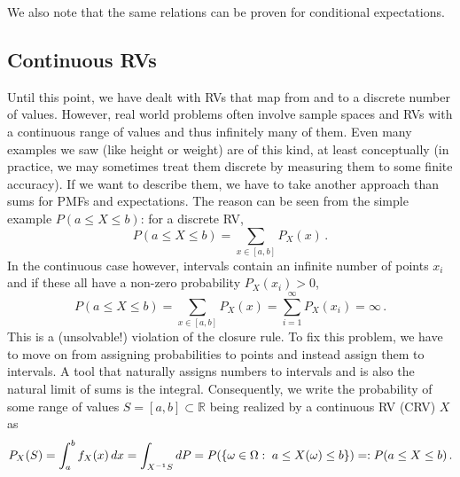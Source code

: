 We also note that the same relations can be proven for conditional expectations.



	\subsection{Continuous RVs}\label{subsec:crvs}
Until this point, we have dealt with RVs that map from and to a discrete number of values. However, real world problems often involve sample spaces and RVs with a continuous range of values and thus infinitely many of them. Even many examples we saw (like height or weight) are of this kind, at least conceptually (in practice, we may sometimes treat them discrete by measuring them to some finite accuracy). If we want to describe them, we have to take another approach than sums for PMFs and expectations. The reason can be seen from the simple example $P(a \leq X \leq b)$: for a discrete RV,
\begin{equation}
P(a \leq X \leq b) = \sum_{x \in [a, b]} P_X(x) \, .
\end{equation}
In the continuous case however, intervals contain an infinite number of points $x_i$ and if these all have a non-zero probability $P_X(x_i) > 0$,
\begin{equation}
P(a \leq X \leq b) = \sum_{x \in [a, b]} P_X(x) = \sum_{i = 1}^\infty P_X(x_i) = \infty \, .
\end{equation}
This is a (unsolvable!) violation of the closure rule. To fix this problem, we have to move on from assigning probabilities to points and instead assign them to intervals. A tool that naturally assigns numbers to intervals and is also the natural limit of sums is the integral. Consequently, we write the probability of some range of values $S = [a, b] \subset \mathbb{R}$ being realized by a continuous RV (CRV) $X$ as
\begin{equation}\label{eq:distr_crv}
P_X(S) = \int_a^b f_X(x) \, dx = \int_{X^{-1} S} dP = P\qty(\qty{\omega \in \Omega: \; a \leq X(\omega) \leq b}) =: P(a \leq X \leq b) \, .
\end{equation}
